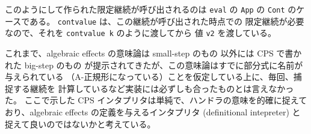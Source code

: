 このようにして作られた限定継続が呼び出されるのは \texttt{eval} の
\texttt{App} の \texttt{Cont} のケースである。
\texttt{cont\US value} は、この継続が呼び出された時点での
限定継続が必要なので、それを \texttt{cont\US value k} のように渡してから
値 \texttt{v2} を渡している。

これまで、algebraic effects の意味論は small-step のもの
\cite{10.1145/2500365.2500590, PRETNAR201519}
以外には
CPS で書かれた big-step のもの
\cite{e6cb0c3222794e48bf38cf44e46fe4aa}
が提示されてきたが、この意味論はすでに部分式に名前が与えられている
（A-正規形になっている）ことを仮定している上に、毎回、捕捉する継続を
計算しているなど実装には必ずしも合ったものとは言えなかった。
ここで示した CPS インタプリタは単純で、ハンドラの意味を的確に捉えて
おり、algebraic effects の定義を与えるインタプリタ (definitional
intepreter) と捉えて良いのではないかと考えている。

